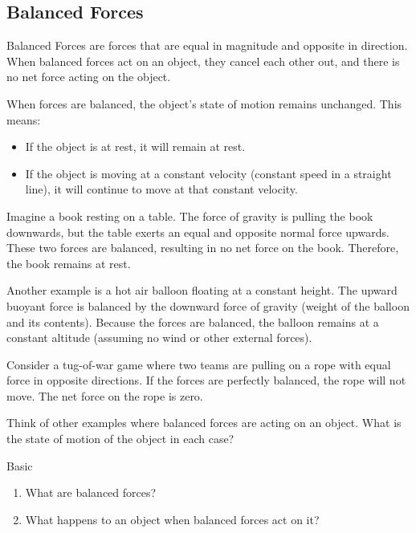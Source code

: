 \subsection{Balanced Forces}

\begin{keyconcept}{Balanced Forces}
 are forces that are equal in magnitude and opposite in direction. When balanced forces act on an object, they cancel each other out, and there is no net force acting on the object.
\end{keyconcept}

When forces are balanced, the object's state of motion remains unchanged.  This means:

\begin{itemize}
    \item If the object is at rest, it will remain at rest.
    \item If the object is moving at a constant velocity (constant speed in a straight line), it will continue to move at that constant velocity.
\end{itemize}

Imagine a book resting on a table.  The force of gravity is pulling the book downwards, but the table exerts an equal and opposite normal force upwards.  These two forces are balanced, resulting in no net force on the book.  Therefore, the book remains at rest.

Another example is a hot air balloon floating at a constant height. The upward buoyant force is balanced by the downward force of gravity (weight of the balloon and its contents).  Because the forces are balanced, the balloon remains at a constant altitude (assuming no wind or other external forces).

\begin{example}
Consider a tug-of-war game where two teams are pulling on a rope with equal force in opposite directions. If the forces are perfectly balanced, the rope will not move.  The net force on the rope is zero.
\end{example}

\begin{stopandthink}
Think of other examples where balanced forces are acting on an object. What is the state of motion of the object in each case?
\end{stopandthink}

\begin{tieredquestions}{Basic}
\begin{enumerate}
    \item What are balanced forces?
    \item What happens to an object when balanced forces act on it?
\end{enumerate}
\end{tieredquestions}

